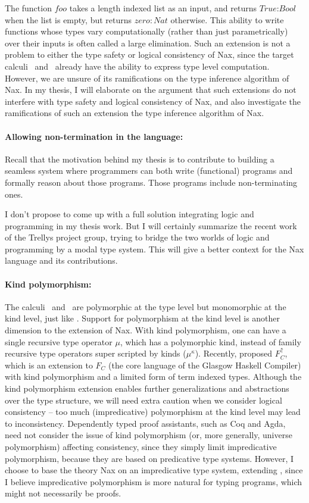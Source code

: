 The function $foo$ takes a length indexed list as an input, and returns
$\textit{True} : \textit{Bool}$ when the list is empty, but returns $zero
: \textit{Nat}$ otherwise.  This ability to write functions whose types
vary computationally (rather than just parametrically) over their inputs
is often called a large elimination. Such an extension is not a problem
to either the type safety or logical consistency of Nax, since the target
calculi \Fi\ and \Fixi\ already have the ability to express type level
computation. However, we are unsure of its ramifications on the type
inference algorithm of Nax. In my thesis, I will elaborate on the
argument that such extensions do not interfere with type safety and
logical consistency of Nax, and also investigate the ramifications 
of such an extension the type inference algorithm of Nax.

\paragraph{Allowing non-termination in the language:}
Recall that the motivation behind my thesis is to contribute to 
building a seamless system where programmers can both write
(functional) programs and formally reason about those programs.
Those programs include non-terminating ones.

I don't propose to come up with a full solution integrating logic and
programming in my thesis work. But I will certainly summarize the recent
work \cite{} of the Trellys project group, trying to bridge the two worlds of
logic and programming by a modal type system. This will give a better context
for the Nax language and its contributions.

\paragraph{Kind polymorphism:}
The calculi \Fi\ and \Fixi\ are polymorphic at the type level but monomorphic at
the kind level, just like \Fw. Support for polymorphism at the kind level is another
dimension to the extension of Nax. With kind polymorphism, one can
have a single recursive type operator $\mu$, which has a polymorphic kind, instead
of family recursive type operators super scripted by kinds ($\mu^\kappa$).
Recently, \citet{YorWeiCrePeyVytMag12} proposed $F_C^{\uparrow}$, which is
an extension to $F_C$ (the core language of the Glasgow Haskell Compiler)
with kind polymorphism and a limited form of term indexed types.
Although the kind polymorphism extension enables further generalizations and
abstractions over the type structure, we will need extra caution when we consider
logical consistency -- too much (impredicative) polymorphism at the kind level may
lead to inconsistency. Dependently typed proof assistants, such as Coq and Agda,
need not consider the issue of kind polymorphism (or, more generally,
universe polymorphism) affecting consistency, since they simply limit
impredicative polymorphism, because they are based on predicative type systems.
However, I choose to base the theory Nax on an impredicative type system,
extending \Fw, since I believe impredicative polymorphism is
more natural for typing programs, which might not necessarily be proofs.

